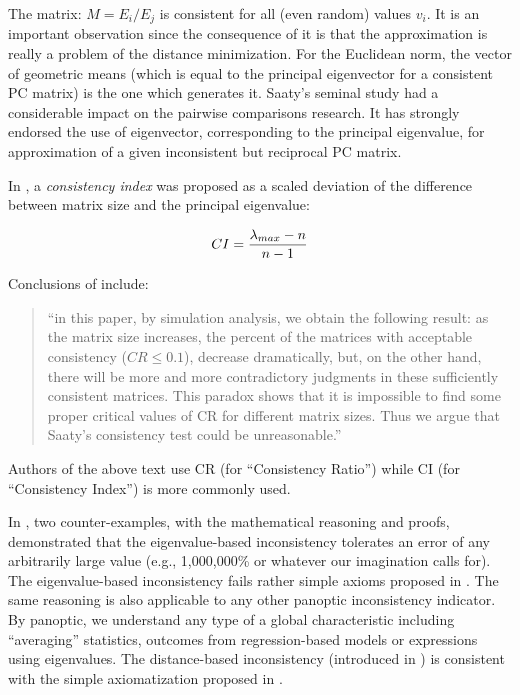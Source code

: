 \documentclass [12pt]{article}
\theoremstyle{definition}
\begin{document}
The matrix: $M= E_i/E_j$ is consistent for all (even random) values $v_i$. It is an important observation since the consequence of it is that the approximation is really a problem of the distance minimization. For the Euclidean norm, the vector of geometric means (which is equal to the principal eigenvector for a consistent PC matrix) is the one which generates it. 
Saaty's seminal study \cite{Saaty77} had a considerable impact on the pairwise comparisons research. 
It has strongly endorsed the use of eigenvector, corresponding to the principal eigenvalue, for approximation of a given inconsistent but reciprocal PC matrix. 


In \cite{Saaty77}, a {\em consistency index} was proposed as a scaled deviation of the difference between matrix size and the principal eigenvalue:

$$CI= {\lambda_{max}-n \over {n-1}}$$

\begin{flushleft}
Conclusions of \cite{XDXW2008} include:
\end{flushleft}
\begin{quotation}
``in this paper, by simulation analysis, we obtain the following
result: as the matrix size increases, the percent of the matrices
with acceptable consistency ($CR \leq 0.1$), decrease dramatically,
but, on the other hand, there will be more and more contradictory
judgments in these sufficiently consistent matrices. This paradox
shows that it is impossible to find some proper critical values
of CR for different matrix sizes. Thus we argue that Saaty's
consistency test could be unreasonable.''
\end{quotation}

Authors of the above text use CR (for ``Consistency Ratio'') while CI (for ``Consistency Index'') is more commonly used.



In \cite{KS2014a}, two counter-examples, with the mathematical reasoning and proofs, demonstrated that the eigenvalue-based inconsistency tolerates an error of any arbitrarily large value (e.g., 1,000,000\% or whatever our imagination calls for). The eigenvalue-based inconsistency fails rather simple axioms proposed in \cite{KS2014a}. 
The same reasoning is also applicable to any other panoptic inconsistency indicator. By panoptic, we understand any type of a global characteristic including ``averaging'' statistics, outcomes from regression-based models or expressions using eigenvalues. 
The distance-based inconsistency (introduced in \cite{Kocz93}) is consistent with the simple axiomatization proposed in \cite{KS2014a}. 
\end{document}
